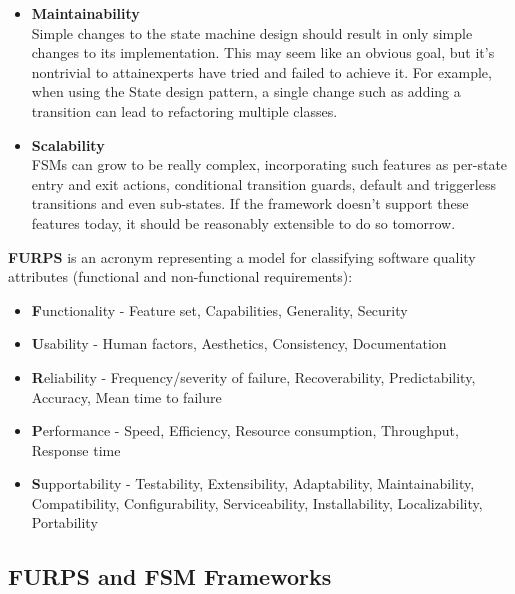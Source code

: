 \begin{itemize}
\item \textbf{Maintainability}\\
    Simple changes to the state machine design should result in only simple changes to
    its implementation. This may seem like an obvious goal, but it's nontrivial to attainexperts have tried
    and failed to achieve it. For example, when using the State design pattern, a single change
    such as adding a transition can lead to refactoring multiple classes.

\item \textbf{Scalability}\\
    FSMs can grow to be really complex, incorporating
    such features as per-state entry and exit actions, conditional transition guards, default and triggerless
    transitions and even sub-states. If the framework doesn't support these features today, it should be
    reasonably extensible to do so tomorrow.
\end{itemize}

\newpage
\textbf{FURPS} is an acronym representing a model for classifying software quality attributes (functional and non-functional requirements):
\begin{itemize}
\item \textbf{F}unctionality - Feature set, Capabilities, Generality, Security
\item \textbf{U}sability - Human factors, Aesthetics, Consistency, Documentation
\item \textbf{R}eliability - Frequency/severity of failure, Recoverability, Predictability, Accuracy, Mean time to failure
\item \textbf{P}erformance - Speed, Efficiency, Resource consumption, Throughput, Response time
\item \textbf{S}upportability - Testability, Extensibility, Adaptability, Maintainability, Compatibility, Configurability, Serviceability, Installability, Localizability, Portability
\end{itemize}

\subsection{FURPS and FSM Frameworks}

